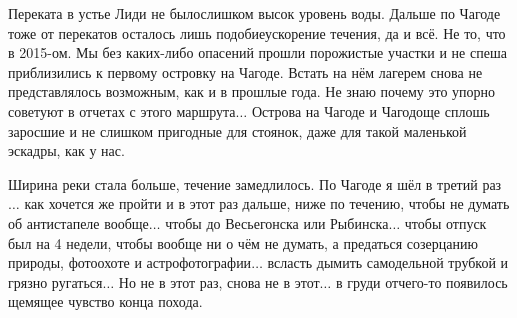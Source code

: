Переката в устье Лиди не было\mdash слишком высок уровень воды. Дальше по Чагоде тоже от перекатов осталось лишь подобие\mdash ускорение течения, да и всё. Не то, что в 2015-ом. Мы без каких-либо опасений прошли порожистые участки и не спеша приблизились к первому островку на Чагоде. Встать на нём лагерем снова не представлялось возможным, как и в прошлые года. Не знаю почему это упорно советуют в отчетах с этого маршрута$\ldots$ Острова на Чагоде и Чагодоще сплошь заросшие и не слишком пригодные для стоянок, даже для такой маленькой эскадры, как у нас.

Ширина реки стала больше, течение замедлилось. По Чагоде я шёл в третий раз$\ldots$ как хочется же пройти и в этот раз дальше, ниже по течению, чтобы не думать об антистапеле вообще$\ldots$ чтобы до Весьегонска или Рыбинска$\ldots$ чтобы отпуск был на 4 недели, чтобы вообще ни о чём не думать, а предаться созерцанию природы, фотоохоте и астрофотографии$\ldots$ всласть дымить самодельной трубкой и грязно ругаться$\ldots$ Но не в этот раз, снова не в этот$\ldots$ в груди отчего-то появилось щемящее чувство конца похода.

\begin{center}
\end{center}
